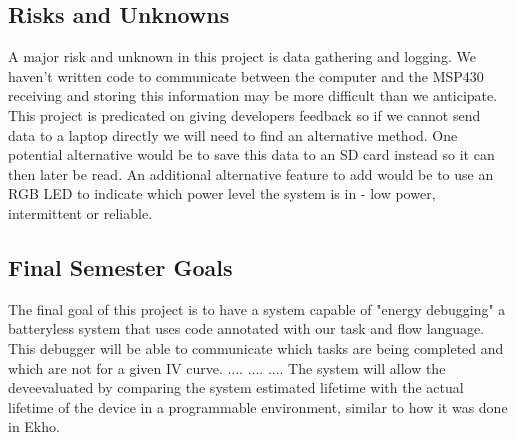 \subsection{Risks and Unknowns}
A major risk and unknown in this project is data gathering and logging.
We haven't written code to communicate between the computer and the MSP430 receiving and storing this information may be more difficult than we anticipate.
This project is predicated on giving developers feedback so if we cannot send data to a laptop directly we will need to find an alternative method.
One potential alternative would be to save this data to an SD card instead so it can then later be read.
An additional alternative feature to add would be to use an RGB LED to indicate which power level the system is in - low power, intermittent or reliable.

\subsection{Final Semester Goals}
The final goal of this project is to have a system capable of "energy debugging" a batteryless system that uses code annotated with our task and flow language.
This debugger will be able to communicate which tasks are being completed and which are not for a given IV curve.
....
....
....
The system will allow the deveevaluated by comparing the system estimated lifetime with the actual lifetime of the device in a programmable environment, similar to how it was done in Ekho.
